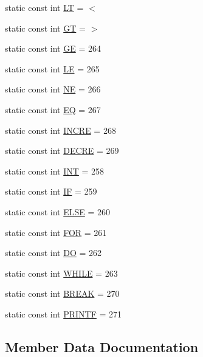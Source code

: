 \begin{DoxyCompactItemize}
\item 
static const int \hyperlink{class_tag_aaad09d061ef5a1979f0742f3df402cc0}{LT} = \textquotesingle{}$<$\textquotesingle{}
\item 
static const int \hyperlink{class_tag_a6805be845a48a88f70bec57afd269c95}{GT} = \textquotesingle{}$>$\textquotesingle{}
\item 
static const int \hyperlink{class_tag_a6d994a4cb6c7fcb155a03b7a91d44bcb}{GE} = 264
\item 
static const int \hyperlink{class_tag_adc918b8b4103c25ea473e7b15bb7bab9}{LE} = 265
\item 
static const int \hyperlink{class_tag_adaaf58a2112230b36e757ef7c70d6fe9}{NE} = 266
\item 
static const int \hyperlink{class_tag_a654bec3c95903280d16610fadf8eeec5}{EQ} = 267
\item 
static const int \hyperlink{class_tag_aed087674890e23fb6678d597824c2613}{I\+N\+C\+RE} = 268
\item 
static const int \hyperlink{class_tag_ab37502d40b1d318449f44302ff5db17d}{D\+E\+C\+RE} = 269
\item 
static const int \hyperlink{class_tag_a38242d609491f491ef9484f1679e7c3d}{I\+NT} = 258
\item 
static const int \hyperlink{class_tag_a92a30db62631be16cad518d2bf59efaa}{IF} = 259
\item 
static const int \hyperlink{class_tag_a4149b756bf94ef2d83f0d1de23ddee10}{E\+L\+SE} = 260
\item 
static const int \hyperlink{class_tag_ac2ba80666f85af3bd539107c7121b16d}{F\+OR} = 261
\item 
static const int \hyperlink{class_tag_a489769ae22c0fcf7c7842206a998abf8}{DO} = 262
\item 
static const int \hyperlink{class_tag_a1ca35b43b49867c19d892103016b09b3}{W\+H\+I\+LE} = 263
\item 
static const int \hyperlink{class_tag_a125fe413cdcec181606fa122a40f0026}{B\+R\+E\+AK} = 270
\item 
static const int \hyperlink{class_tag_a85ff0086e29d3d6a8f6c78695df0bd52}{P\+R\+I\+N\+TF} = 271
\end{DoxyCompactItemize}


\subsection{Member Data Documentation}
\mbox{\label{class_tag_a125fe413cdcec181606fa122a40f0026}} 
